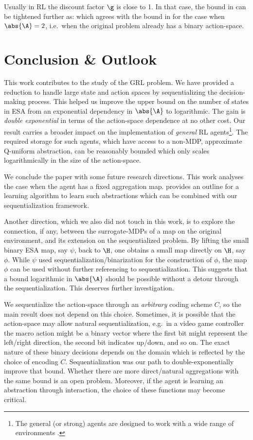 \documentclass{article} %
\begin{document}
Usually in RL the discount factor $\g$ is close to 1. In that case, the bound in  can be tightened further as:
\beq
\abs{\S} \lesssim {}
\eeq
which agrees with the bound in  for the case when $\abs{\A} = 2$, i.e.\ when the original problem already has a binary action-space.

\section{Conclusion \& Outlook}\label{sec:conclusion}

This work contributes to the study of the GRL problem. We have provided a reduction to handle large state and action spaces by sequentializing the decision-making process.
This helped us improve the upper bound on the number of states in ESA from an exponential dependency in $\abs{\A}$ to logarithmic. The gain is \emph{double exponential} in terms of the action-space dependence at no other cost.  
Our result carries a broader impact on the implementation of \emph{general} RL agents\footnote{The general (or strong) agents are designed to work with a wide range of environments \cite{Hutter2000}.}. The required storage for such agents, which have access to a non-MDP, approximate Q-uniform abstraction, can be reasonably bounded which only scales logarithmically in the size of the action-space.

We conclude the paper with some future research directions. This work analyses the case when the agent has a fixed aggregation map. \citet{Hutter2016} provides an outline for a learning algorithm to learn such abstractions which can be combined with our sequentialization framework.

Another direction, which we also did not touch in this work, is to explore the connection, if any, between the surrogate-MDPs of a map on the original environment, and its extension on the sequentialized problem. By lifting the small binary ESA map, say $\psi$, back to $\H$, one obtains a small map directly on $\H$, say $\phi$. While $\psi$ used sequentialization/binarization for the construction of $\phi$, the map $\phi$ can be used without further referencing to sequentialization. This suggests that a bound logarithmic in $\abs{\A}$ should be possible without a detour through the sequentialization. This deserves further investigation.

We sequentialize the action-space through an \emph{arbitrary} coding scheme $C$, so the main result does not depend on this choice. Sometimes, it is possible that the action-space may allow natural sequentialization, e.g.\ in a video game controller the macro action might be a binary vector where the first bit might represent the left/right direction, the second bit indicates up/down, and so on. The exact nature of these binary decisions depends on the domain which is reflected by the choice of encoding $C$. Sequentialization was our path to double-exponentially improve that bound. Whether there are more direct/natural aggregations with the same bound is an open problem. Moreover, if the agent is learning an abstraction through interaction, the choice of these functions may become critical.
\end{document}

